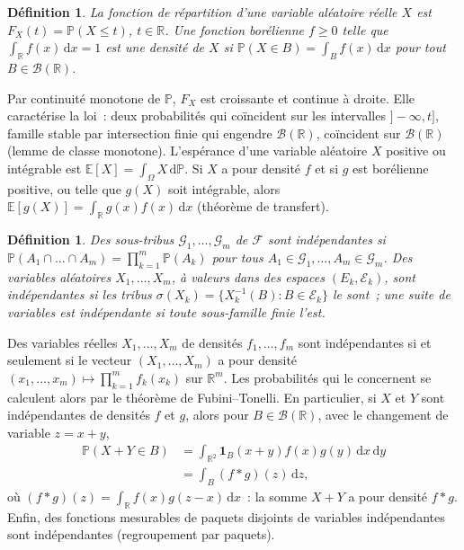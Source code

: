 \documentclass[10pt,a4paper,twocolumn]{article}
\theoremstyle{enonce}
\theoremstyle{defi}
\newtheorem{definition}[theoreme]{Définition}
\newcommand{\PP}{\mathbb{P}}
\newcommand{\EE}{\mathbb{E}}
\newcommand{\dd}{\mathrm{d}}
\newcommand{\un}{\mathbf{1}}
\begin{document}
\begin{definition}
La \emph{fonction de répartition} d'une variable aléatoire réelle $X$ est $F_X(t)=\PP(X\leq t)$, $t\in\mathbb{R}$. Une fonction borélienne $f\geq0$ telle que $\int_{\mathbb{R}}f(x)\,\dd x=1$ est une \emph{densité} de $X$ si $\PP(X\in B)=\int_Bf(x)\,\dd x$ pour tout $B\in\mathcal{B}(\mathbb{R})$.
\end{definition}

Par continuité monotone de $\PP$, $F_X$ est croissante et continue à droite. Elle caractérise la loi~: deux probabilités qui coïncident sur les intervalles $]-\infty,t]$, famille stable par intersection finie qui engendre $\mathcal{B}(\mathbb{R})$, coïncident sur $\mathcal{B}(\mathbb{R})$ (lemme de classe monotone). L'espérance d'une variable aléatoire $X$ positive ou intégrable est $\EE[X]=\int_\Omega X\,\dd\PP$. Si $X$ a pour densité $f$ et si $g$ est borélienne positive, ou telle que $g(X)$ soit intégrable, alors $\EE[g(X)]=\int_{\mathbb{R}}g(x)f(x)\,\dd x$ (théorème de transfert).

\begin{definition}
Des sous-tribus $\mathcal{G}_1,\dots,\mathcal{G}_m$ de $\mathcal{F}$ sont \emph{indépendantes} si $\PP(A_1\cap\dots\cap A_m)=\prod_{k=1}^m\PP(A_k)$ pour tous $A_1\in\mathcal{G}_1,\dots,A_m\in\mathcal{G}_m$. Des variables aléatoires $X_1,\dots,X_m$, à valeurs dans des espaces $(E_k,\mathcal{E}_k)$, sont indépendantes si les tribus $\sigma(X_k)=\{X_k^{-1}(B):B\in\mathcal{E}_k\}$ le sont~; une suite de variables est indépendante si toute sous-famille finie l'est.
\end{definition}

Des variables réelles $X_1,\dots,X_m$ de densités $f_1,\dots,f_m$ sont indépendantes si et seulement si le vecteur $(X_1,\dots,X_m)$ a pour densité $(x_1,\dots,x_m)\mapsto\prod_{k=1}^mf_k(x_k)$ sur $\mathbb{R}^m$. Les probabilités qui le concernent se calculent alors par le théorème de Fubini--Tonelli. En particulier, si $X$ et $Y$ sont indépendantes de densités $f$ et $g$, alors pour $B\in\mathcal{B}(\mathbb{R})$, avec le changement de variable $z=x+y$,
\begin{align*}
\PP(X+Y\in B)&=\int_{\mathbb{R}^2}\un_B(x+y)f(x)g(y)\,\dd x\,\dd y\\
&=\int_B(f*g)(z)\,\dd z,
\end{align*}
où $(f*g)(z)=\int_{\mathbb{R}}f(x)g(z-x)\,\dd x$~: la somme $X+Y$ a pour densité $f*g$. Enfin, des fonctions mesurables de paquets disjoints de variables indépendantes sont indépendantes (regroupement par paquets).
\end{document}
